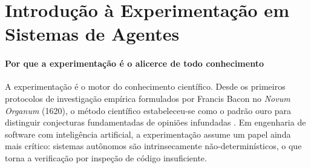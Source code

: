 \begin{table}[htb]
\centering
    \small
\caption{Conteúdo do Capítulo 7}
\label{tab:conteudo-capitulo7}
\end{table}

\section{Introdução à Experimentação em Sistemas de Agentes}
\label{sec:introducao-experimentacao}
\nivelzero

\paragraph{Por que a experimentação é o alicerce de todo conhecimento} A experimentação é o motor do conhecimento científico. Desde os
primeiros protocolos de investigação empírica formulados por Francis
Bacon no \textit{Novum Organum} (1620), o método científico
estabeleceu-se como o padrão ouro para distinguir conjecturas
fundamentadas de opiniões infundadas \cite{bacon1620novum,
popper2003logica}. Em engenharia de software com inteligência
artificial, a experimentação assume um papel ainda mais crítico:
sistemas autônomos são intrinsecamente não-determinísticos, o que
torna a verificação por inspeção de código insuficiente.

